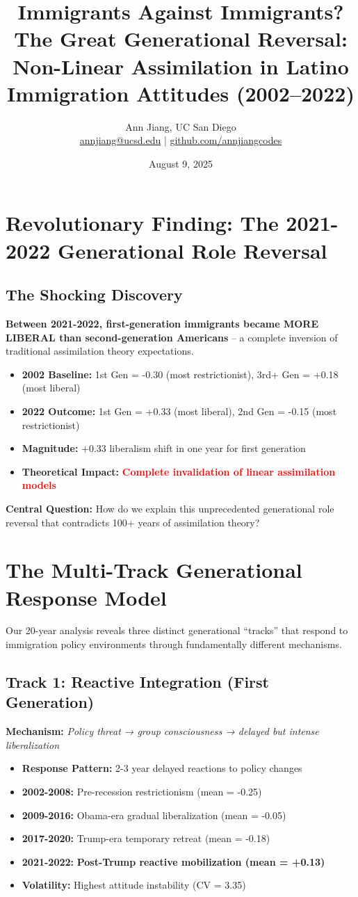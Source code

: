 \documentclass[11pt,letterpaper]{article}
\title{\textbf{Immigrants Against Immigrants?}\\
\large The Great Generational Reversal: Non-Linear Assimilation in Latino Immigration Attitudes (2002--2022)}
\author{Ann Jiang, UC San Diego\\
\href{mailto:annjiang@ucsd.edu}{annjiang@ucsd.edu} | \href{https://github.com/annjiangcodes}{github.com/annjiangcodes}}
\date{August 9, 2025}
\newcommand{\compactdesc}[2]{\item \textbf{#1:} #2}
\newcommand{\keyfinding}[1]{\colorbox{yellow!20}{\textbf{#1}}}
\newcommand{\surprise}[1]{\textcolor{red}{\textbf{#1}}}
\begin{document}
\maketitle

\section{Revolutionary Finding: The 2021-2022 Generational Role Reversal}

\subsection{The Shocking Discovery}

\keyfinding{Between 2021-2022, first-generation immigrants became MORE LIBERAL than second-generation Americans} -- a complete inversion of traditional assimilation theory expectations.

\begin{itemize}
    \compactdesc{2002 Baseline}{1st Gen = -0.30 (most restrictionist), 3rd+ Gen = +0.18 (most liberal)}
    \compactdesc{2022 Outcome}{1st Gen = +0.33 (most liberal), 2nd Gen = -0.15 (most restrictionist)}
    \compactdesc{Magnitude}{+0.33 liberalism shift in one year for first generation}
    \compactdesc{Theoretical Impact}{\surprise{Complete invalidation of linear assimilation models}}
\end{itemize}

\textbf{Central Question:} How do we explain this unprecedented generational role reversal that contradicts 100+ years of assimilation theory?

\section{The Multi-Track Generational Response Model}

Our 20-year analysis reveals three distinct generational ``tracks'' that respond to immigration policy environments through fundamentally different mechanisms.

\subsection{Track 1: Reactive Integration (First Generation)}

\textbf{Mechanism:} \textit{Policy threat → group consciousness → delayed but intense liberalization}

\begin{itemize}
    \compactdesc{Response Pattern}{2-3 year delayed reactions to policy changes}
    \compactdesc{2002-2008}{Pre-recession restrictionism (mean = -0.25)}
    \compactdesc{2009-2016}{Obama-era gradual liberalization (mean = -0.05)}
    \compactdesc{2017-2020}{Trump-era temporary retreat (mean = -0.18)}
    \compactdesc{2021-2022}{\keyfinding{Post-Trump reactive mobilization (mean = +0.13)}}
    \compactdesc{Volatility}{Highest attitude instability (CV = 3.35)}
\end{itemize}
\end{document}
